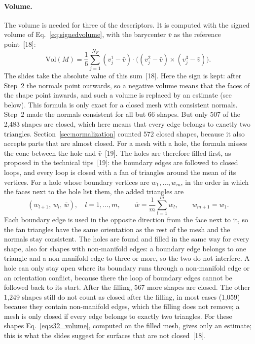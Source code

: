 \documentclass[10pt,a4paper]{article}
\begin{document}
\paragraph{Volume.}
The volume is needed for three of the descriptors. It is computed with the signed volume of Eq.~\eqref{eq:signedvolume}, with the
barycenter $\bar v$ as the reference point~[18]:
\begin{equation}
\mathrm{Vol}(M) = \frac16\sum_{j=1}^{N_F} (v_j^1-\bar v)\cdot\big((v_j^2-\bar v)\times(v_j^3-\bar v)\big).
\label{eq:s32_volume}
\end{equation}
The slides take the absolute value of this sum~[18]. Here the sign is kept: after Step~2 the normals point outwards, so a negative
volume means that the faces of the shape point inwards, and such a volume is replaced by an estimate (see below).
This formula is only exact for a closed mesh with consistent normals. Step~2 made the normals consistent for all but 66
shapes. But only 507 of the 2,483 shapes are closed, which here means that every edge belongs to exactly two triangles.
Section~\ref{sec:normalization} counted 572 closed shapes, because it also accepts parts that are almost closed. For a mesh with a hole, the formula misses the cone between the hole
and $\bar v$~[19]. The holes are therefore filled first, as proposed in the technical tips~[19]: the boundary edges are
followed to closed loops, and every loop is closed with a fan of triangles around the mean of its vertices. For a hole whose
boundary vertices are $w_1,\ldots,w_m$, in the order in which the faces next to the hole list them, the added triangles are
\begin{equation}
(w_{l+1},\,w_l,\,\bar w),\quad l=1,\ldots,m,\qquad \bar w=\frac1m\sum_{l=1}^{m}w_l,\qquad w_{m+1}=w_1 .
\label{eq:s32_fan}
\end{equation}
Each boundary edge is used in the opposite direction from the face next to it, so the fan triangles have the same orientation as
the rest of the mesh and the normals stay consistent. The holes are found and filled in the same way for every shape, also for
shapes with non-manifold edges: a boundary edge belongs to one triangle and a non-manifold edge to three or more, so the two do
not interfere. A hole can only stay open where its boundary runs through a non-manifold edge or an orientation conflict, because
there the loop of boundary edges cannot be followed back to its start. After the filling, 567 more shapes are closed. The other
1,249 shapes still do not count as closed after the filling, in most cases (1,059) because they contain non-manifold edges,
which the filling does not remove; a mesh is only closed if every edge belongs to exactly two triangles. For these shapes
Eq.~\eqref{eq:s32_volume}, computed on the filled mesh, gives only an estimate; this is what the slides suggest for surfaces that
are not closed~[18].
\end{document}
